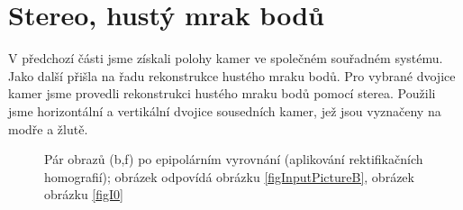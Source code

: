 \documentclass[11pt,oneside,a4paper,pdftex]{article}   %
\begin{document}
	
\section{Stereo, hustý mrak bodů}
	
	V předchozí části jsme získali polohy kamer ve společném souřadném systému. Jako další
	přišla na řadu rekonstrukce hustého mraku bodů.
	Pro vybrané dvojice kamer jsme provedli rekonstrukci hustého mraku bodů pomocí sterea.  Použili jsme
	horizontální a vertikální dvojice sousedních kamer, jež jsou vyznačeny na 
	modře a žlutě.

			\begin{figure}[htbp]
					\centering
				\caption{Pár obrazů (b,f) po epipolárním vyrovnání (aplikování rektifikačních homografií);
					obrázek  odpovídá obrázku \ref{figInputPictureB},
					obrázek  obrázku \ref{figI0}}
				\label{figRectifiedImagesForStereo}
			\end{figure}
\end{document}
